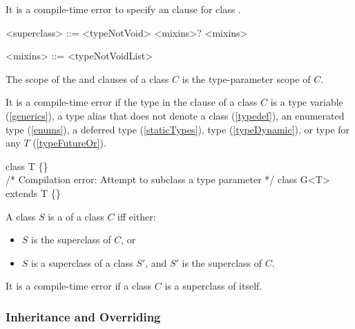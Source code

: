 \documentclass[makeidx]{article}
\begin{document}
\LMHash{}%
It is a compile-time error to specify an \EXTENDS{} clause
for class .

\begin{grammar}
<superclass> ::= \EXTENDS{} <typeNotVoid> <mixins>?
    \alt <mixins>

<mixins> ::= \WITH{} <typeNotVoidList>
\end{grammar}

\LMHash{}%
The scope of the \EXTENDS{} and \WITH{} clauses of a class $C$ is
the type-parameter scope of $C$.

\LMHash{}%
It is a compile-time error if the type
in the \EXTENDS{} clause of a class $C$ is
a type variable (\ref{generics}),
a type alias that does not denote a class (\ref{typedef}),
an enumerated type (\ref{enums}),
a deferred type (\ref{staticTypes}), type \DYNAMIC{} (\ref{typeDynamic}),
or type  for any $T$ (\ref{typeFutureOr}).



\begin{dartCode}
class T \{\}
\\
/* Compilation error: Attempt to subclass a type parameter */
class G<T> extends T \{\}
\end{dartCode}

\LMHash{}%
A class $S$ is a  of a class $C$ if{}f either:
\begin{itemize}
\item $S$ is the superclass of $C$, or
\item $S$ is a superclass of a class $S'$,
  and $S'$ is the superclass of $C$.
\end{itemize}

\LMHash{}%
It is a compile-time error if a class $C$ is a superclass of itself.


\subsubsection{Inheritance and Overriding}
\end{document}
